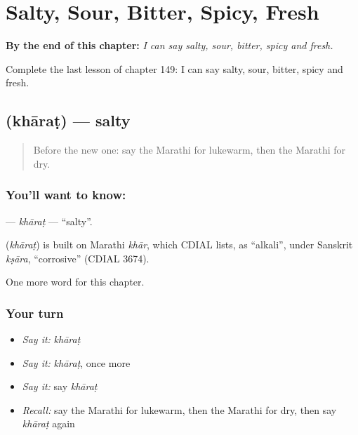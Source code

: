 
\chapter{Salty, Sour, Bitter, Spicy, Fresh}
\label{ch:mr-salty-sour-bitter-spicy-fresh}

\begin{chapteropening}
\textbf{By the end of this chapter:} \emph{I can say salty, sour, bitter, spicy and fresh.}

Complete the last lesson of chapter 149: I can say salty, sour, bitter, spicy and fresh.
\end{chapteropening}

\section[\texorpdfstring{\mr{खारट} (khāraṭ)}{खारट (khāraṭ)}]{ (khāraṭ) — salty}

\label{lesson:MR-C149-kharat}



\begin{quote}
Before the new one: say the Marathi for lukewarm, then the Marathi for dry.
\end{quote}

\subsection*{You'll want to know: }
\textbf{} — \emph{khāraṭ} — \textquotedblleft{}salty\textquotedblright{}.

\begin{cousinweb}
\textbf{} (\emph{khāraṭ}) is built on Marathi \emph{khār}, which CDIAL lists, as \textquotedblleft{}alkali\textquotedblright{}, under Sanskrit \emph{kṣāra}, \textquotedblleft{}corrosive\textquotedblright{} (CDIAL 3674).
\end{cousinweb}

\begin{grammarlens}[title={What you've built}]
One more word for this chapter.
\end{grammarlens}

\subsection*{Your turn}
\begin{itemize}
\raggedright
  \item \emph{Say it:} \emph{khāraṭ}
  \item \emph{Say it:} \emph{khāraṭ}, once more
  \item \emph{Say it:} say \emph{khāraṭ}
  \item \emph{Recall:} say the Marathi for lukewarm, then the Marathi for dry, then say \emph{khāraṭ} again
\end{itemize}

